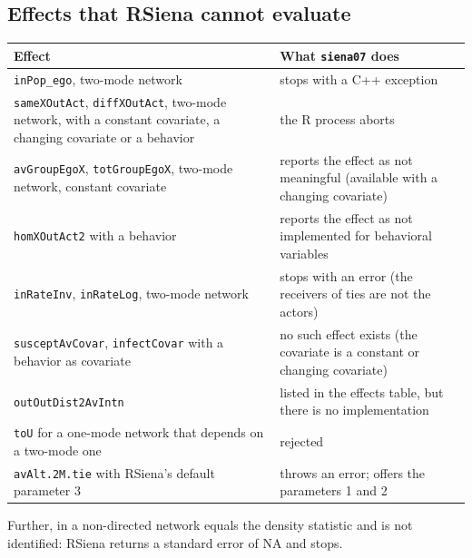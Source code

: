 \subsection{Effects that RSiena cannot evaluate}\label{sec:cannoteval}
\begin{center}\small
\begin{tabular}{@{}p{4.2cm}p{10.4cm}@{}}
\toprule
Effect & What \texttt{siena07} does\\
\midrule
\texttt{inPop\_ego}, two-mode network & stops with a C++ exception\\
\texttt{sameXOutAct}, \texttt{diffXOutAct}, two-mode network, with a constant covariate, a changing covariate or a behavior & the R process aborts\\
\texttt{avGroupEgoX}, \texttt{totGroupEgoX}, two-mode network, constant covariate & reports the effect as not meaningful (available with a changing covariate)\\
\texttt{homXOutAct2} with a behavior & reports the effect as not implemented for behavioral variables\\
\texttt{inRateInv}, \texttt{inRateLog}, two-mode network & stops with an error (the receivers of ties are not the actors)\\
\texttt{susceptAvCovar}, \texttt{infectCovar} with a behavior as covariate & no such effect exists (the covariate is a constant or changing covariate)\\
\texttt{outOutDist2AvIntn} & listed in the effects table, but there is no implementation\\
\texttt{toU} for a one-mode network that depends on a two-mode one & rejected\\
\texttt{avAlt.2M.tie} with RSiena's default parameter 3 & throws an error; \nwsaom{} offers the parameters 1 and 2\\
\bottomrule
\end{tabular}
\end{center}
Further,  in a non-directed network equals the density statistic and is not identified: RSiena returns a standard error of NA and \nwsaom{} stops.

